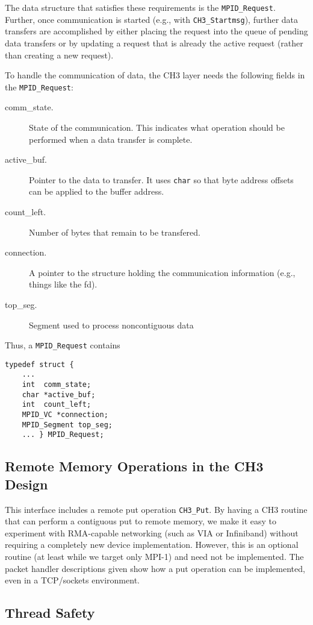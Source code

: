 \documentclass{article}
\def\code{\begingroup\makeustext\eatcode}
\def\eatcode#1{\texttt{#1}\endgroup}
\begin{document}
The data structure that satisfies these requirements is the
\code{MPID_Request}.  Further, once communication is started (e.g., with
\code{CH3_Startmsg}), further data transfers are accomplished by either placing
the request into the queue of pending data transfers or by updating a request
that is already the active request (rather than creating a new request).

To handle the communication of data, the CH3 layer needs the following fields
in the \code{MPID_Request}:
\begin{description}
\item[comm\_state.]State of the communication.  This indicates what operation
  should be performed when a data transfer is complete.
\item[active\_buf.]Pointer to the data to transfer.  It uses \code{char} so
  that byte address offsets can be applied to the buffer address.
\item[count\_left.]Number of bytes that remain to be transfered.
\item[connection.]A pointer to the structure holding the communication
  information (e.g., things like the fd).
\item[top\_seg.]Segment used to process noncontiguous data
\end{description}

Thus, a \code{MPID_Request} contains
\begin{verbatim}
typedef struct { 
    ...
    int  comm_state;
    char *active_buf;
    int  count_left;
    MPID_VC *connection;
    MPID_Segment top_seg;
    ... } MPID_Request;
\end{verbatim}

\subsection{Remote Memory Operations in the CH3 Design}
This interface includes a remote put operation \code{CH3_Put}.
By having a CH3 routine that can perform a contiguous put to remote memory, we
make it easy to experiment with RMA-capable networking (such as VIA or
Infiniband) without 
requiring a completely new device implementation.  However, this is an
optional routine (at least while we target only MPI-1) and need not be
implemented.  The packet handler descriptions given show how a put
operation can be implemented, even in a TCP/sockets environment.

\subsection{Thread Safety}
\end{document}
